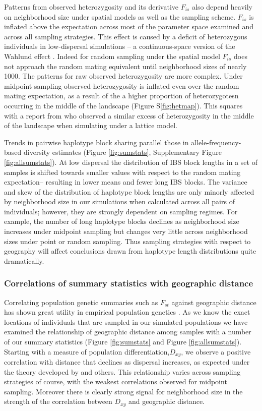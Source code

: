 \documentclass[11pt,twoside,lineno]{preprint}
\begin{document}
Patterns from observed heterozygosity and its derivative $F_{is}$ also depend heavily on neighborhood size under spatial models as well as the sampling scheme. $F_{is}$ is inflated above the expectation across most of the parameter space examined and across all sampling strategies. This effect is caused by a deficit of heterozygous individuals in low-dispersal simulations -- a continuous-space version of the Wahlund effect \citep{Wahlund1928}. Indeed for random sampling under the spatial model $F_{is}$ does not approach the random mating equivalent until neighborhood sizes of nearly 1000. The patterns for raw observed heterozygosity are more complex. Under midpoint sampling observed heterozygosity is inflated even over the random mating expectation, as a result of the a higher proportion of heterozygotesn occurring in the middle of the landscape (Figure S\ref{fig:hetmap}). This squares with a report from \cite{Shirk2014} who observed a similar excess of heterozygosity in the middle of the landscape when simulating under a lattice model.

Trends in pairwise haplotype block sharing parallel those in allele-frequency-based diversity estimates (Figure \ref{fig:sumstats}, Supplementary Figure \ref{fig:allsumstats}). At low dispersal the distribution of IBS block lengths in a set of samples is shifted towards smaller values with respect to the random mating expectation-- resulting in lower means and fewer long IBS blocks. The variance and skew of the distribution of haplotype block lengths are only minorly affected by neighborhood size in our simulations when calculated across all pairs of individuals; however, they are strongly dependent on sampling regimes. For example, the number of long haplotype blocks declines as neighborhood size increases under midpoint sampling but changes very little across neighborhood sizes under point or random sampling. Thus sampling strategies with respect to geography will affect conclusions drawn from haplotype length distributions quite dramatically. 

\subsubsection{Correlations of summary statistics with geographic distance}
Correlating population genetic summaries such as $F_{st}$ against geographic distance has shown great utility in empirical population genetics \citep{Rousset1997}. As we know the exact locations of individuals that are sampled in our simulated populations we have examined the relationship of geographic distance among samples with a number of our summary statistics (Figure \ref{fig:sumstats} and Figure \ref{fig:allsumstats}). Starting with a measure of population differentiation,$D_{xy}$, we observe a positive correlation with distance that declines as dispersal increases, as expected under the theory developed by \citep{Rousset1997} and others. This relationship varies across sampling strategies of course, with the weakest correlations observed for midpoint sampling. Moreover there is clearly strong signal for  neighborhood size in the strength of the correlation between $D_{xy}$ and geographic distance.
\end{document}
